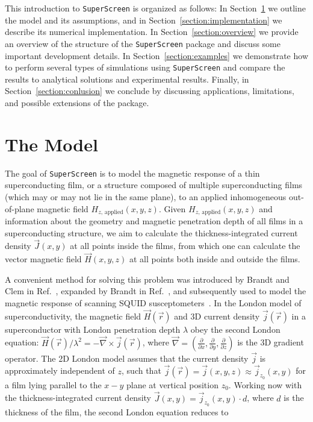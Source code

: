 \documentclass[final,3p,times,twocolumn]{elsarticle}
\newcommand{\inline}[1]{\texttt{#1}\xspace}
\newcommand{\SuperScreen}{\inline{SuperScreen}}
\newcounter{bla}
\begin{document}
This introduction to \SuperScreen is organized as follows: In Section~\ref{section:model} we outline the model and its assumptions, and in Section~\ref{section:implementation} we describe its numerical implementation. In Section~\ref{section:overview} we provide an overview of the structure of the \SuperScreen package and discuss some important development details. In Section~\ref{section:examples} we demonstrate how to perform several types of simulations using \SuperScreen and compare the results to analytical solutions and experimental results. Finally, in Section~\ref{section:conlusion} we conclude by discussing applications, limitations, and possible extensions of the package.

\section{The Model}
\label{section:model}

The goal of \SuperScreen is to model the magnetic response of a thin superconducting film, or a structure composed of multiple superconducting films (which may or may not lie in the same plane), to an applied inhomogeneous out-of-plane magnetic field
$H_{z,\,\mathrm{applied}}(x, y, z)$. Given $H_{z,\,\mathrm{applied}}(x, y, z)$ and information about the geometry and magnetic penetration depth of all films in a superconducting structure, we aim to calculate the thickness-integrated current density $\vec{J}(x, y)$ at all points inside the films, from which one can calculate the vector magnetic field $\vec{H}(x, y, z)$ at all points both inside and outside the films.

A convenient method for solving this problem was introduced by Brandt and Clem in Ref.~\cite{Brandt2004-ew}, expanded by Brandt in Ref.~\cite{Brandt2005-wj}, and subsequently used to model the magnetic response of scanning SQUID susceptometers~\cite{Kirtley2016-zz, Kirtley2016-gt}. In the London model of superconductivity, the magnetic field $\vec{H}(\vec{r})$ and 3D current density $\vec{j}(\vec{r})$ in a superconductor with London penetration depth $\lambda$ obey the second London equation:
$\vec{H}(\vec{r})/\lambda^2=-\vec{\nabla}\times\vec{j}(\vec{r})$, where
$\vec{\nabla}=\left(\frac{\partial}{\partial x}, \frac{\partial}{\partial y}, \frac{\partial}{\partial z}\right)$ is the 3D gradient operator. The 2D London model assumes that the current density $\vec{j}$ is approximately independent of $z$, such that  $\vec{j}(\vec{r}) = \vec{j}(x, y, z)\approx\vec{j}_{z_0}(x, y)$ for a film lying parallel to the $x-y$ plane at vertical position $z_0$. Working now with the thickness-integrated current density $\vec{J}(x, y)=\vec{j}_{z_0}(x, y)\cdot d$, where $d$
is the thickness of the film, the second London equation reduces to
\end{document}
